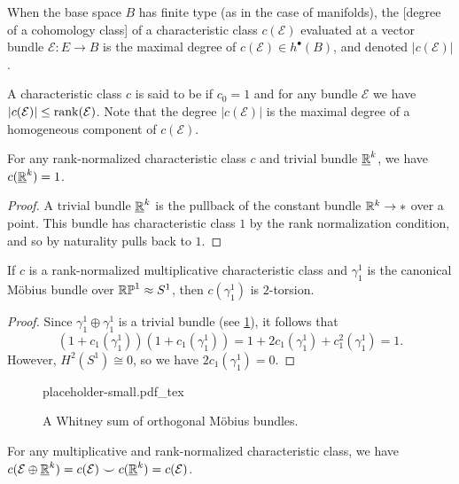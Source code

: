 \begin{remark}
	When the base space $B$ has finite type (as in the case of manifolds), the [degree of a cohomology class] of a characteristic class $c(\mathcal{E})$ evaluated at a vector bundle $\mathcal{E} : E \to B$ is the maximal degree of $c(\mathcal{E})\in h^\bullet(B)$, and denoted $|c(\mathcal{E})|$.
\end{remark}

\begin{definition}
	A characteristic class $c$ is said to be  if $c_0=1$ and for any bundle $\mathcal{E}$ we have $|c(\mathcal{E})|\leq \operatorname{rank}(\mathcal{E})$. Note that the degree $|c(\mathcal{E})|$ is the maximal degree of a homogeneous component of $c(\mathcal{E})$.
\end{definition}

\begin{corollary}
	For any rank-normalized characteristic class $c$ and trivial bundle $\underline{\mathbb{R}}^k$, we have $c(\underline{\mathbb{R}}^k)=1$.
\end{corollary}
\begin{proof}
	A trivial bundle $\underline{\mathbb{R}}^k$ is the pullback of the constant bundle $\mathbb{R}^k\to *$ over a point. This bundle has characteristic class $1$ by the rank normalization condition, and so by naturality pulls back to $1$.
\end{proof}

\begin{corollary}\label{cor:mobius-characteristic-2-torsion}
	If $c$ is a rank-normalized multiplicative characteristic class and $\gamma_1^1$ is the canonical M\"obius bundle over $\mathbb{RP}^1\approx S^1$, then $c(\gamma_1^1)$ is $2$-torsion.
\end{corollary}
\begin{proof}
	Since $\gamma_1^1\oplus \gamma^1_1$ is a trivial bundle (see \cref{fig:trivial-mobius-bundle-sum}), it follows that
	\[
		(1+c_1(\gamma_1^1))(1+c_1(\gamma_1^1)) = 1+2c_1(\gamma_1^1)+c_1^2(\gamma_1^1)=1.
	\]
	However, $H^2(S^1)\cong 0$, so we have $2c_1(\gamma_1^1)=0$.
\end{proof}

\begin{figure}[ht]
	\centering
	{placeholder-small.pdf_tex}
	\caption{A Whitney sum of orthogonal M\"obius bundles.}\label{fig:trivial-mobius-bundle-sum}
\end{figure}

\begin{corollary}
	For any multiplicative and rank-normalized characteristic class, we have $c(\mathcal{E}\oplus \underline{\mathbb{R}}^k)=c(\mathcal{E})\smile c(\underline{\mathbb{R}}^k)= c(\mathcal{E})$.
\end{corollary}

